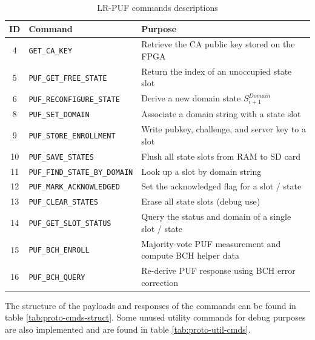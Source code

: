   \begin{table}[ht!]
  \centering
  \caption{LR-PUF commands descriptions}
  \begin{tabular}{cll}
  \hline
  \textbf{ID} & \textbf{Command} & \textbf{Purpose} \\
  \hline
  4  & \texttt{GET\_CA\_KEY}             & Retrieve the CA public key stored on the FPGA \\
  5  & \texttt{PUF\_GET\_FREE\_STATE}    & Return the index of an unoccupied state slot \\
  6  & \texttt{PUF\_RECONFIGURE\_STATE}  & Derive a new domain state $S^{Domain}_{i+1}$ \\
  8  & \texttt{PUF\_SET\_DOMAIN}         & Associate a domain string with a state slot \\
  9  & \texttt{PUF\_STORE\_ENROLLMENT}   & Write pubkey, challenge, and server key to a slot \\
  10 & \texttt{PUF\_SAVE\_STATES}        & Flush all state slots from RAM to SD card \\
  11 & \texttt{PUF\_FIND\_STATE\_BY\_DOMAIN} & Look up a slot by domain string \\
  12 & \texttt{PUF\_MARK\_ACKNOWLEDGED}  & Set the acknowledged flag for a slot / state \\
  13 & \texttt{PUF\_CLEAR\_STATES}       & Erase all state slots (debug use) \\
  14 & \texttt{PUF\_GET\_SLOT\_STATUS}   & Query the status and domain of a single slot / state \\
  15 & \texttt{PUF\_BCH\_ENROLL}         & Majority-vote PUF measurement and compute BCH helper data \\
  16 & \texttt{PUF\_BCH\_QUERY}          & Re-derive PUF response using BCH error correction \\
  \hline
  \end{tabular}
  \label{tab:proto-cmds}
  \end{table}

The structure of the payloads and responses of the commands can be found in table \ref{tab:proto-cmds-struct}. Some unused utility commands for debug purposes are also implemented and are found in table \ref{tab:proto-util-cmds}.

